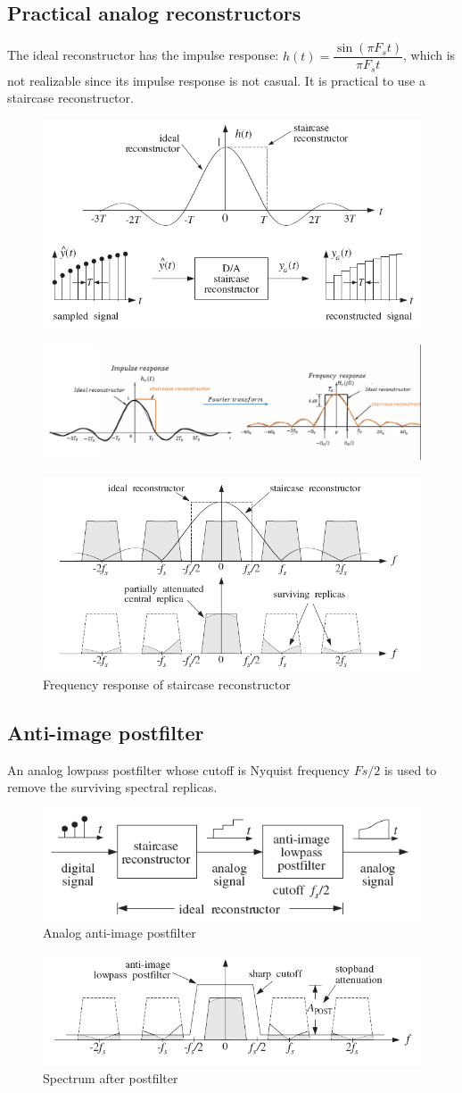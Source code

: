 \subsection{Practical analog reconstructors}
The ideal reconstructor has the impulse response: $h(t) = \dfrac{\sin(\pi F_s t)}{\pi F_s t}$, which is not realizable since its impulse response is not casual. It is practical to use a staircase
reconstructor.
\begin{figure}[h!]
    \centering
    \includegraphics[width=0.6\linewidth]{img/12.png}
\end{figure}
\begin{figure}[h!]
    \centering
    \includegraphics[width=0.5\linewidth]{img/13.png}
\end{figure}
\begin{figure}[h!]
    \centering
    \includegraphics[width=0.5\linewidth]{img/14.png}
    \caption{Frequency response of staircase reconstructor}
\end{figure}
\newpage
\subsection{Anti-image postfilter}
An analog lowpass postfilter whose cutoff is Nyquist frequency $Fs/2$ is used to remove the surviving spectral replicas.
\begin{figure}[h!]
    \centering
    \includegraphics[width=0.5\linewidth]{img/15.png}
    \caption{Analog anti-image postfilter}
\end{figure}
\begin{figure}[h!]
    \centering
    \includegraphics[width=0.5\linewidth]{img/16.png}
    \caption{Spectrum after postfilter}
\end{figure}